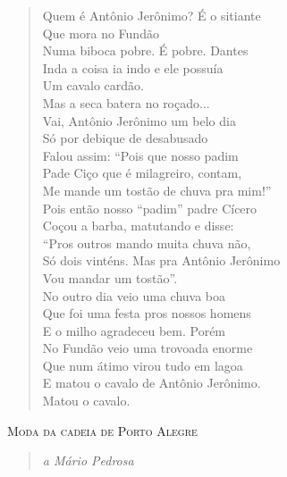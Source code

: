 \begin{verse}
Quem é Antônio Jerônimo? É o sitiante\\
\quad\quad{}Que mora no Fundão\\
Numa biboca pobre. É pobre. Dantes\\
Inda a coisa ia indo e ele possuía\\
\quad\quad{}Um cavalo cardão.\\
Mas a seca batera no roçado...\\
Vai, Antônio Jerônimo um belo dia\\
Só por debique de desabusado\\
Falou assim: ``Pois que nosso padim\\
Pade Ciço que é milagreiro, contam,\\
Me mande um tostão de chuva pra mim!''\\
Pois então nosso ``padim'' padre Cícero\\
Coçou a barba, matutando e disse:\\
``Pros outros mando muita chuva não,\\
Só dois vinténs. Mas pra Antônio Jerônimo\\
\quad\quad{}Vou mandar um tostão''.\\
No outro dia veio uma chuva boa\\
Que foi uma festa pros nossos homens\\
E o milho agradeceu bem. Porém\\
No Fundão veio uma trovoada enorme\\
Que num átimo virou tudo em lagoa\\
E matou o cavalo de Antônio Jerônimo.\\
\quad\quad{}Matou o cavalo.
\end{verse}

\textsc{Moda da cadeia de Porto Alegre}

\begin{quote}
\emph{a Mário Pedrosa}
\end{quote}

